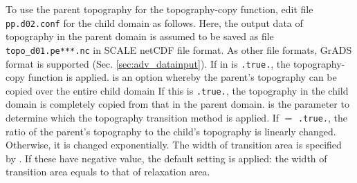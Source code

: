 To use the parent topography for the topography-copy function, edit file \verb|pp.d02.conf| for the child domain as follows.
Here, the output data of topography in the parent domain is assumed to be saved as file \verb|topo_d01.pe***.nc| in SCALE netCDF file format.
As other file formats, GrADS format is supported (Sec. \ref{sec:adv_datainput}).
If  in  is \verb|.true.|, the topography-copy function is applied.
 is an option whereby the parent’s topography can be copied over the entire child domain
If this is \verb|.true.|, the topography in the child domain is completely copied from that in the parent domain.
 is the parameter to determine which the topography transition method is applied. If  $=$ \verb|.true.|, the ratio of the parent’s topography to the child’s topography is linearly changed. Otherwise, it is changed exponentially.
The width of transition area is specified by . If these have negative value, the default setting is applied: the width of transition area equals to that of relaxation area.


